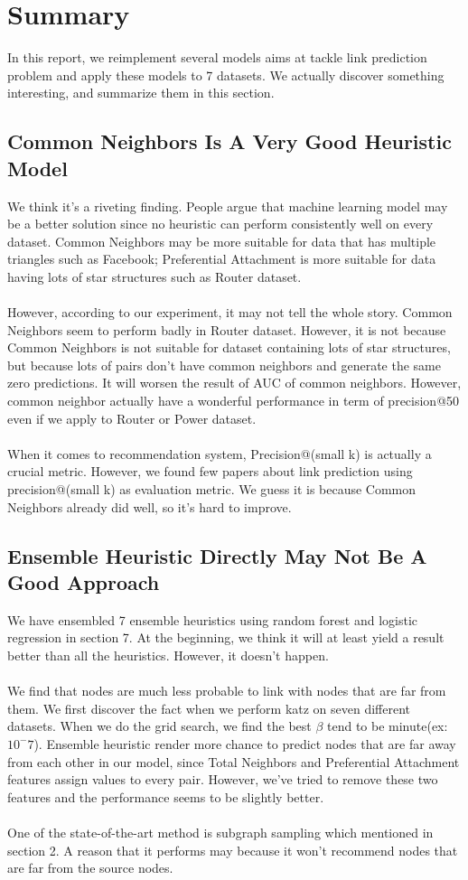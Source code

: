 \documentclass[12pt]{article}
\begin{document}
\section{Summary}
In this report, we reimplement several models aims at tackle link prediction problem and apply these models to 7 datasets. We actually discover something interesting, and summarize them in this section.

\subsection{Common Neighbors Is A Very Good Heuristic Model}
We think it's a riveting finding. People argue that machine learning model may be a better solution since no heuristic can perform consistently well on every dataset. Common Neighbors may be more suitable for data that has multiple triangles such as Facebook; Preferential Attachment is more suitable for data having lots of star structures such as Router dataset. 
\\ \\
However, according to our experiment, it may not tell the whole story. Common Neighbors seem to perform badly in Router dataset. However, it is not because Common Neighbors is not suitable for dataset containing lots of star structures, but because lots of pairs don't have common neighbors and generate the same zero predictions. It will worsen the result of AUC of common neighbors. However, common neighbor actually have a wonderful performance in term of precision@50 even if we apply to Router or Power dataset.
\\ \\
When it comes to recommendation system, Precision@(small k) is actually a crucial metric. However, we found few papers about link prediction using precision@(small k) as evaluation metric. We guess it is because Common Neighbors already did well, so it's hard to improve. 

\subsection{Ensemble Heuristic Directly May Not Be A Good Approach}
We have ensembled 7 ensemble heuristics using random forest and logistic regression in section 7. At the beginning, we think it will at least yield a result better than all the heuristics. However, it doesn't happen. 
\\ \\
We find that nodes are much less probable to link with nodes that are far from them. We first discover the fact when we perform katz on seven different datasets. When we do the grid search, we find the best $\beta$ tend to be minute(ex: $10^-7$). Ensemble heuristic render more chance to predict nodes that are far away from each other in our model, since Total Neighbors and Preferential Attachment features assign values to every pair. However, we've tried to remove these two features and the performance seems to be slightly better.  
\\ \\
One of the state-of-the-art method is subgraph sampling which mentioned in section 2. A reason that it performs may because it won't recommend nodes that are far from the source nodes. 
\end{document}
